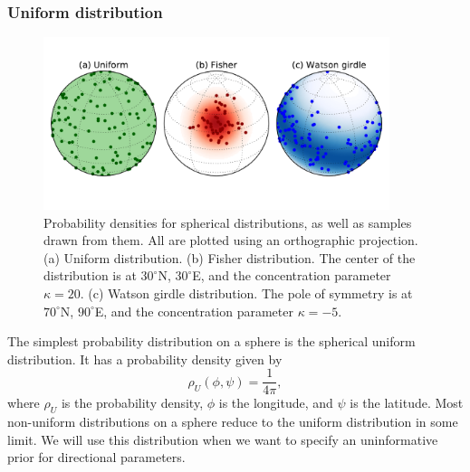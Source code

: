 \documentclass[preprint,12pt,authoryear]{elsarticle}
\begin{document}
\subsubsection{Uniform distribution}
\begin{figure}
\includegraphics[width=0.9\textwidth]{figures/cartoon/distributions.pdf}
\caption[Spherical probability distributions.]{Probability densities for spherical distributions, as well as samples drawn from them. All are plotted using an orthographic projection. (a) Uniform distribution. (b) Fisher distribution. The center of the distribution is at $30^\circ$N, $30^\circ$E, and the concentration parameter $\kappa=20$. (c) Watson girdle distribution. The pole of symmetry is at $70^\circ$N, $90^\circ$E, and the concentration parameter $\kappa=-5$.}
\label{fig:distributions}
\end{figure}

The simplest probability distribution on a sphere is the spherical uniform distribution.
It has a probability density given by
\begin{equation}
  \rho_U(\phi, \psi) = \frac{1}{4 \pi},
\end{equation}
where $\rho_U$ is the probability density, $\phi$ is the longitude, and $\psi$ is the latitude.
Most non-uniform distributions on a sphere reduce to the uniform distribution in some limit.
We will use this distribution when we want to specify an uninformative prior for directional parameters.
\end{document}
